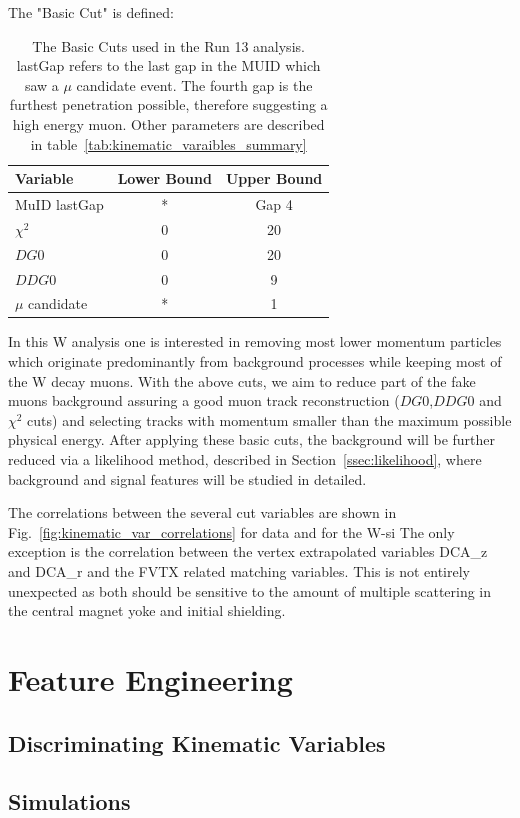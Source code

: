 The "Basic Cut" is defined:
\begin{table}
	\begin{centering}
		\begin{tabular}{l c c}
			\toprule
			\textbf{Variable} & \textbf{Lower Bound} & \textbf{Upper Bound} \\
			\midrule
			MuID lastGap & * & Gap 4 \\ 
			$\chi^2$ & 0 & 20 \\
			$DG0$ & 0 & 20 \\
			$DDG0$ & 0 & 9 \\
			$\mu$ candidate & * & 1 \\
			\bottomrule
		\end{tabular}
		\caption{ The Basic Cuts used in the Run 13 analysis. lastGap refers to the
			last gap in the MUID which saw a $\mu$ candidate event. The fourth gap is
			the furthest penetration possible, therefore suggesting a high energy muon.
		Other parameters are described in table~\ref{tab:kinematic_varaibles_summary}}
		\label{tab:basic_cut}
	\end{centering}
\end{table}



In this W analysis one is interested in removing most lower momentum particles
which originate predominantly from background processes while keeping most of
the W decay muons. With the above cuts, we aim to reduce part of the fake muons
background assuring a good muon track reconstruction ($DG0$,$DDG0$ and $\chi^2$
cuts) and selecting tracks with momentum smaller than the maximum possible
physical energy. After applying these basic cuts, the background will be further
reduced via a likelihood method, described in Section~\ref{ssec:likelihood}, where
background and signal features will be studied in detailed.

The correlations between the several cut variables are shown in
Fig.~\ref{fig:kinematic_var_correlations} for data and for the W-si The only
exception is the correlation between the vertex extrapolated variables DCA\_z
and DCA\_r and the FVTX related matching variables. This is not entirely
unexpected as both should be sensitive to the amount of multiple scattering in
the central magnet yoke and initial shielding.

\section{Feature Engineering}
\subsection{Discriminating Kinematic Variables}
\subsection{Simulations}
